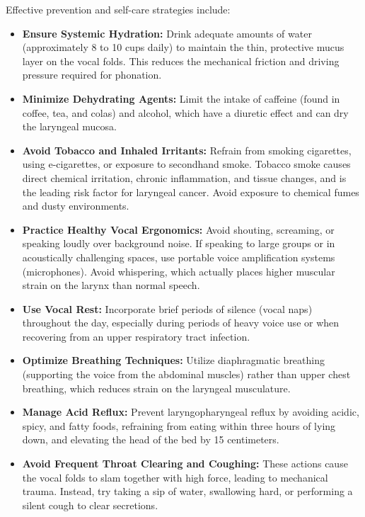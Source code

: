 Effective prevention and self-care strategies include:
\begin{itemize}
    \item \textbf{Ensure Systemic Hydration:} Drink adequate amounts of water (approximately 8 to 10 cups daily) to maintain the thin, protective mucus layer on the vocal folds. This reduces the mechanical friction and driving pressure required for phonation.
    \item \textbf{Minimize Dehydrating Agents:} Limit the intake of caffeine (found in coffee, tea, and colas) and alcohol, which have a diuretic effect and can dry the laryngeal mucosa.
    \item \textbf{Avoid Tobacco and Inhaled Irritants:} Refrain from smoking cigarettes, using e-cigarettes, or exposure to secondhand smoke. Tobacco smoke causes direct chemical irritation, chronic inflammation, and tissue changes, and is the leading risk factor for laryngeal cancer. Avoid exposure to chemical fumes and dusty environments.
    \item \textbf{Practice Healthy Vocal Ergonomics:} Avoid shouting, screaming, or speaking loudly over background noise. If speaking to large groups or in acoustically challenging spaces, use portable voice amplification systems (microphones). Avoid whispering, which actually places higher muscular strain on the larynx than normal speech.
    \item \textbf{Use Vocal Rest:} Incorporate brief periods of silence (vocal naps) throughout the day, especially during periods of heavy voice use or when recovering from an upper respiratory tract infection.
    \item \textbf{Optimize Breathing Techniques:} Utilize diaphragmatic breathing (supporting the voice from the abdominal muscles) rather than upper chest breathing, which reduces strain on the laryngeal musculature.
    \item \textbf{Manage Acid Reflux:} Prevent laryngopharyngeal reflux by avoiding acidic, spicy, and fatty foods, refraining from eating within three hours of lying down, and elevating the head of the bed by 15 centimeters.
    \item \textbf{Avoid Frequent Throat Clearing and Coughing:} These actions cause the vocal folds to slam together with high force, leading to mechanical trauma. Instead, try taking a sip of water, swallowing hard, or performing a silent cough to clear secretions.
\end{itemize}

